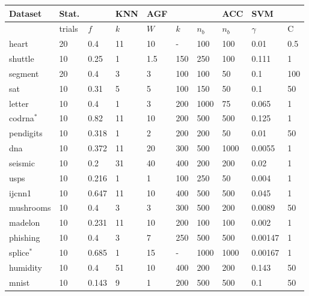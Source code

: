 
\begin{tabular}{|l||ll|l|lll|l|ll|}
	\hline
Dataset	& Stat. & & KNN & AGF & & & ACC & SVM & \\\hline
 & trials & $f$ & $k$ & $W$ & $k$ & $n_b$ & $n_b$ & $\gamma$ & C\\\hline\hline
	heart & 20 & 0.4 & 11 & 10 & - & 100 & 100 & 0.01 & 0.5 \\
	shuttle & 10 & 0.25 & 1 & 1.5 & 150 & 250 & 100 & 0.111 & 1 \\
	segment & 20 & 0.4 & 3 & 3 & 100 & 100 & 50 & 0.1 & 100 \\
	sat & 10 & 0.31 & 5 & 5 & 100 & 150 & 50 & 0.1 & 50\\
	letter & 10 & 0.4 & 1 & 3 & 200 & 1000 & 75 & 0.065 & 1 \\
	codrna$^*$ & 10 & 0.82 & 11 & 10 & 200 & 500 & 500 & 0.125 & 1 \\
	pendigits & 10 & 0.318 & 1 & 2 & 200 & 200 & 50 & 0.01 & 50 \\
	dna & 10 & 0.372 & 11 & 20 & 300 & 500 & 1000 & 0.0055 & 1 \\
	seismic & 10 & 0.2 & 31 & 40 & 400 & 200 & 200 & 0.02 & 1 \\
	usps & 10 & 0.216 & 1 & 1 & 100 & 250 & 50 & 0.004 & 1 \\
	ijcnn1 & 10 & 0.647 & 11 & 10 & 400 & 500 & 500 & 0.045 & 1 \\
	mushrooms & 10 & 0.4 & 3 & 3 & 300 & 500 & 200 & 0.0089 & 50 \\
	madelon & 10 & 0.231 & 11 & 10 & 200 & 100 & 100 & 0.002 & 1 \\
	phishing & 10 & 0.4 & 3 & 7 & 250 & 500 & 500 & 0.00147 & 1 \\
	splice$^*$ & 10 & 0.685 & 1 & 15 & - & 1000 & 1000 & 0.00167 & 1 \\
	humidity & 10 & 0.4 & 51 & 10 & 400 & 200 & 200 & 0.143 & 50 \\
	mnist & 10 & 0.143 & 9 & 1 & 200 & 500 & 500 & 0.1 & 50 \\
	\hline
\end{tabular}

